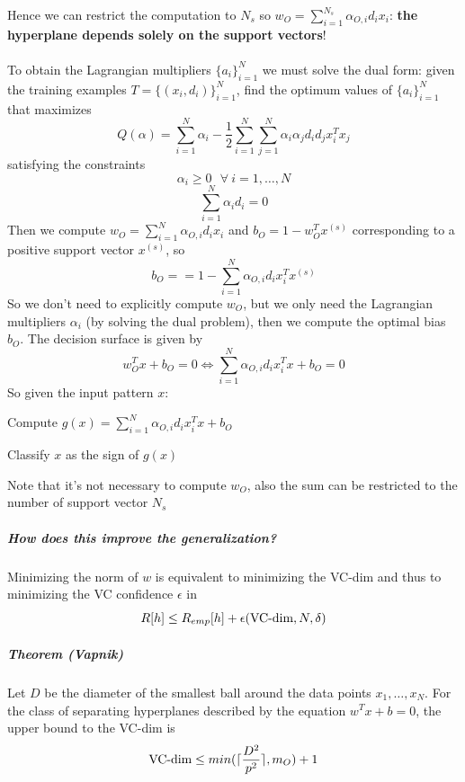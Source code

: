 \documentclass[10pt]{report}
\begin{document}
Hence we can restrict the computation to $N_s$ so $w_O=\sum_{i=1}^{N_s} \alpha_{O,i}d_ix_i$: \textbf{the hyperplane depends solely on the support vectors}!\\\\
To obtain the Lagrangian multipliers $\{a_i\}_{i=1}^N$ we must solve the dual form: given the training examples $T = \{(x_i, d_i)\}_{i=1}^N$, find the optimum values of $\{a_i\}_{i=1}^N$ that maximizes $$Q(\alpha) = \sum_{i=1}^N \alpha_i - \frac{1}{2}\sum_{i=1}^N\sum_{j=1}^N\alpha_i\alpha_jd_id_jx_i^Tx_j$$ satisfying the constraints $$\alpha_i\geq 0\:\:\:\forall\:i=1,\ldots,N$$ $$\sum_{i=1}^N\alpha_id_i = 0$$
Then we compute $w_O = \sum_{i=1}^N\alpha_{O,i}d_ix_i$ and $b_O = 1-w_O^Tx^{(s)}$ corresponding to a positive support vector $x^{(s)}$, so $$b_O = = 1-\sum_{i=1}^N\alpha_{O,i}d_ix_i^Tx^{(s)}$$
So we don't need to explicitly compute $w_O$, but we only need the Lagrangian multipliers $\alpha_i$ (by solving the dual problem), then we compute the optimal bias $b_O$. The decision surface is given by $$w_O^Tx + b_O = 0 \Leftrightarrow\sum_{i=1}^N\alpha_{O,i}d_i x_i^Tx + b_O = 0$$
So given the input pattern $x$:
\begin{list}{}{}
	\item Compute $g(x) = \sum_{i=1}^N \alpha_{O,i}d_ix_i^Tx + b_O$
	\item Classify $x$ as the sign of $g(x)$
\end{list}
Note that it's not necessary to compute $w_O$, also the sum can be restricted to the number of support vector $N_s$
\subparagraph{How does this improve the generalization?} Minimizing the norm of $w$ is equivalent to minimizing the VC-dim and thus to minimizing the VC confidence $\epsilon$ in $$R[h] \leq R_{emp}[h] + \epsilon(\hbox{VC-dim}, N, \delta)$$
\subparagraph{Theorem (Vapnik)} Let $D$ be the diameter of the smallest ball around the data points $x_1,\ldots,x_N$. For the class of separating hyperplanes described by the equation $w^Tx+b = 0$, the upper bound to the VC-dim is $$\hbox{VC-dim} \leq min(\lceil\frac{D^2}{p^2}\rceil, m_O) + 1$$
\end{document}
